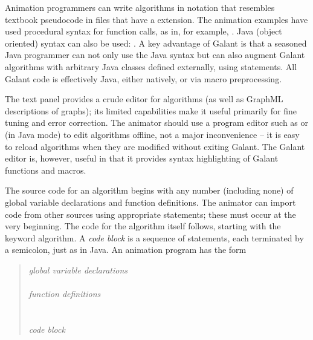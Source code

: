 Animation programmers can write algorithms in notation that resembles
textbook pseudocode
in files that have a  extension.
The animation examples have used procedural syntax for function calls, as in, for example,
.
Java (object oriented) syntax can also be used: .
A key advantage of Galant is that a seasoned Java programmer can
not only use the Java syntax but can also augment Galant algorithms with
arbitrary Java classes defined externally, using  statements.
All Galant code is effectively Java, either natively, or via macro preprocessing.

The text panel provides a crude editor for algorithms (as well as GraphML
descriptions of graphs);
its limited capabilities make it useful primarily for fine tuning and error correction.
The animator should use a program editor such as  or
 (in Java mode) to edit algorithms offline,
not a major inconvenience -- it is easy to reload algorithms when they are modified
without exiting Galant.
The Galant editor is, however, useful in that it provides syntax highlighting of Galant
functions and macros.

The source code for an algorithm begins with any number (including none)
of global variable declarations and function definitions.
The animator can import code from other sources using appropriate
 statements; these must occur at the very beginning.
The code for the algorithm itself follows, starting with the keyword
\textsf{algorithm}.
A \emph{code block}
is a sequence of statements, each terminated by a semicolon, just as in
Java.
An animation program has the form
\begin{quote}
  \emph{global variable declarations}\\
  \\
  \emph{function definitions}\\
  \\
  \\
  \hspace*{2em}\emph{code block}\\
  \Code{\}}
\end{quote}

